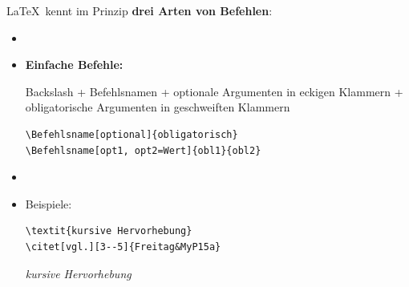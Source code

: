 \begin{frame}[fragile]

\LaTeX\ kennt im Prinzip \textbf{drei Arten von Befehlen}:

\begin{itemize}

\item[]
\item \textbf{Einfache Befehle:}

Backslash \gqq{\textbackslash} + Befehlsnamen + optionale Argumenten in eckigen Klammern + obligatorische Argumenten in geschweiften Klammern


\begin{lstlisting}
\Befehlsname[optional]{obligatorisch} 
\Befehlsname[opt1, opt2=Wert]{obl1}{obl2}
\end{lstlisting}

\pause 

\item[]
\item Beispiele:

\begin{lstlisting}
\textit{kursive Hervorhebung} 
\citet[vgl.][3--5]{Freitag&MyP15a}
\end{lstlisting}

\pause 

\ea \textit{kursive Hervorhebung} 
\ex \citet[vgl.][3--5]{Freitag&MyP15a}
\z 

\end{itemize}

\end{frame}



